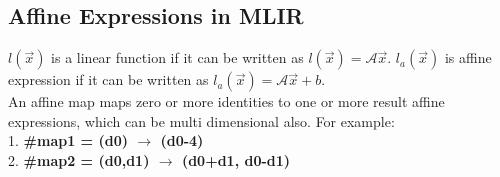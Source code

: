 \documentclass{article}
\begin{document}
\subsection*{Affine Expressions in MLIR}
$l(\vec{x})$ is a linear function if it can be written as $l(\vec{x}) = \mathcal{A}\vec{x}$. $l_a(\vec{x})$ is affine expression if it can be written as $l_a(\vec{x}) = \mathcal{A}\vec{x} + b$. \\

An affine map maps zero or more identities to one or more result affine expressions, which can be multi dimensional also. For example: \\ 
1. \textbf{\#map1 = (d0) $\rightarrow$ (d0-4)} \\
2. \textbf{\#map2 = (d0,d1) $\rightarrow$ (d0+d1, d0-d1)} \\ 
\end{document}
